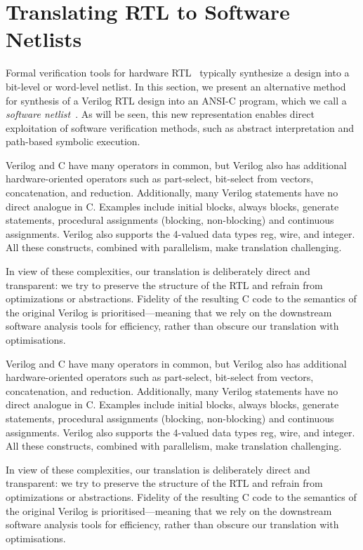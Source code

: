 \section{Translating RTL to Software Netlists}\label{sec:v2c}
%
Formal verification tools for hardware RTL~\cite{abc,DBLP:conf/fmcad/BradleyM07,vis} typically
synthesize a design into a bit-level or word-level netlist.  In this section, we
present an alternative method for synthesis of a Verilog RTL design into an ANSI-C program, which we
call a \textit{software netlist}~\cite{mkm2015,mtk2016}. As will be seen, this new representation
enables direct exploitation of software verification methods, such as
abstract interpretation and path-based symbolic execution.

Verilog and C have many operators in common, but  Verilog also has
additional hardware-oriented operators such as part-select, bit-select from vectors, concatenation,
and reduction. Additionally, many Verilog statements have no direct analogue in C. Examples include
initial blocks, always blocks, generate statements, procedural assignments
(blocking, non-blocking) and continuous assignments. Verilog also supports the 4-valued data types
reg, wire, and integer.  All these constructs, combined with
parallelism, make translation challenging.

In view of these complexities, our translation is deliberately direct and transparent: we try to
preserve the structure of the RTL and refrain from optimizations or abstractions. Fidelity of the
resulting C code to the semantics of the original Verilog is prioritised---meaning that we rely on
the downstream software analysis tools for efficiency, rather than obscure our translation with
optimisations.

Verilog and C have many operators in common, but  Verilog also has 
additional hardware-oriented operators such as part-select, bit-select from vectors, concatenation, and reduction. Additionally, many Verilog statements have no direct analogue in C. Examples include
initial blocks, always blocks, generate statements, procedural assignments
(blocking, non-blocking) and continuous assignments. Verilog also supports the 4-valued data types 
reg, wire, and integer.  All these constructs, combined with 
parallelism, make translation challenging.

In view of these complexities, our translation is deliberately direct and transparent: we try to preserve the structure of the RTL and refrain from optimizations or abstractions. Fidelity of the resulting C code to the semantics of the original Verilog is prioritised---meaning that we rely on the downstream software analysis tools for efficiency, rather than obscure our translation with optimisations. 

